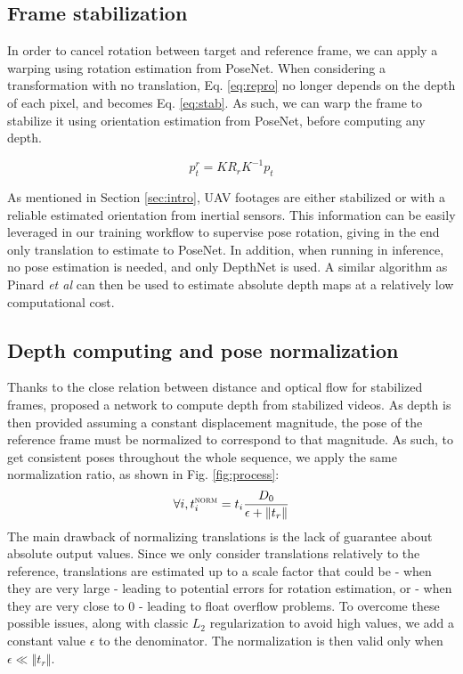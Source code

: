 \documentclass[runningheads]{llncs}
\def\etal{\emph{et al}\:}
\begin{document}
\subsection{Frame stabilization}
In order to cancel rotation between target and reference frame, we can apply a warping using rotation estimation from PoseNet. When considering a transformation with no translation, Eq. \ref{eq:repro} no longer depends on the depth of each pixel, and becomes Eq. \ref{eq:stab}. As such, we can warp the frame to stabilize it using orientation estimation from PoseNet, before computing any depth.

\begin{equation}
\label{eq:stab}
p^r_t=KR_rK^{-1}p_t
\end{equation}

As mentioned in Section \ref{sec:intro}, UAV footages are either stabilized or with a reliable estimated orientation from inertial sensors. This information can be easily leveraged in our training workflow to supervise pose rotation, giving in the end only translation to estimate to PoseNet. In addition, when running in inference, no pose estimation is needed, and only DepthNet is used. A similar algorithm as Pinard \etal \cite{pinard:hal-01587658} can then be used to estimate absolute depth maps at a relatively low computational cost.

\subsection{Depth computing and pose normalization}
Thanks to the close relation between distance and optical flow for stabilized frames, \cite{isprs-annals-IV-2-W3-67-2017} proposed a network to compute depth from stabilized videos.
As depth is then provided assuming a constant displacement magnitude, the pose of the reference frame must be normalized to correspond to that magnitude.
As such, to get consistent poses throughout the whole sequence, we apply the same normalization ratio, as shown in Fig. \ref{fig:process}:
\begin{equation}
\forall i, t_i^{\textsc{norm}} = t_i\frac{D_0}{\epsilon + \Vert t_r\Vert}
\end{equation}
The main drawback of normalizing translations is the lack of guarantee about absolute output values. Since we only consider translations relatively to the reference, translations are estimated up to a scale factor that could be - when they are very large - leading to potential errors for rotation estimation, or - when they are very close to $0$ - leading to float overflow problems. To overcome these possible issues, along with classic $L_2$ regularization to avoid high values, we add a constant value $\epsilon$ to the denominator. The normalization is then valid only when
$\epsilon \ll \left\Vert t_r \right\Vert$.
\end{document}
